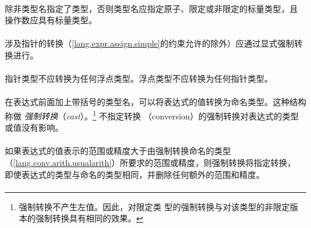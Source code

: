 {

\syntax
\paragraph{}

\constraint
\paragraph{}
除非类型名指定了类型，否则类型名应指定原子、限定或非限定的标量类型，且
操作数应具有标量类型。

\paragraph{}
涉及指针的转换（\ref{lang.expr.assign.simple}的约束允许的除外）应通过显式强制转
换进行。

\paragraph{}
指针类型不应转换为任何浮点类型。浮点类型不应转换为任何指针类型。

\semantic
\paragraph{}
在表达式前面加上带括号的类型名，可以将表达式的值转换为命名类型。这种结构称做
\textit{强制转换}（\textit{cast}）。\footnote{强制转换不产生左值。因此，对限定类
型的强制转换与对该类型的非限定版本的强制转换具有相同的效果。} 不指定转换
（conversion）的强制转换对表达式的类型或值没有影响。

\paragraph{}
如果表达式的值表示的范围或精度大于由强制转换命名的类型
（\ref{lang.conv.arith.usualarith}）所要求的范围或精度，则强制转换将指定转换，
即使表达式的类型与命名的类型相同，并删除任何额外的范围和精度。


\syntax
\paragraph{}

}

